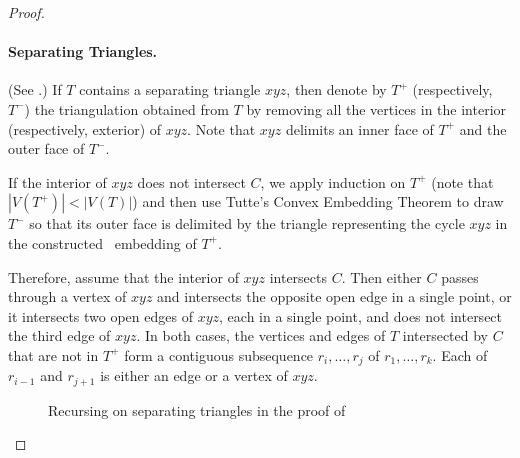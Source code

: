 \begin{proof}
	
	\paragraph{Separating Triangles.}
	(See .)
	If $T$ contains a separating triangle $xyz$, then denote by $T^+$ (respectively, $T^-$) the triangulation obtained from $T$ by removing all the vertices in the interior (respectively, exterior) of $xyz$. Note that $xyz$ delimits an inner face of $T^+$ and the outer face of $T^-$. 
	
	If the interior of $xyz$ does not intersect $C$, we apply induction on $T^+$ (note that $|V(T^+)|<|V(T)|$) and then use Tutte's Convex Embedding Theorem  \cite{tutte:how} to draw $T^-$ so that its outer face is delimited by the triangle representing the cycle $xyz$ in the constructed \Fary\ embedding of $T^+$.
	
	Therefore, assume that the interior of $xyz$ intersects $C$. Then either $C$ passes through a vertex of $xyz$ and intersects the opposite open edge in a single point, or it intersects two open edges of $xyz$, each in a single point, and does not intersect the third edge of $xyz$. 
	In both cases, the vertices and edges of $T$ intersected by $C$ that are not in $T^+$ form a contiguous
	subsequence $r_i,\ldots,r_j$ of $r_1,\ldots,r_k$. Each of $r_{i-1}$ and $r_{j+1}$ is either an edge or a vertex of $xyz$.  
	
	\begin{figure}
		\caption{Recursing on separating triangles in the proof of
			}
	\end{figure}
	

\end{proof}
